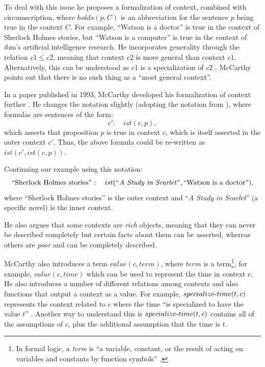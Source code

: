 To deal with this issue he proposes a formalization of context, combined with circumscription, where $holds(p, C)$ is an abbreviation for the sentence $p$ being true in the context $C$. For example, ``Watson is a doctor'' is true in the context of Sherlock Holmes stories, but ``Watson is a computer'' is true in the context of \acrshort{ibm}'s artificial intelligence research. He incorporates generality through the relation $c1 \le c2$, meaning that context $c2$ is more general than context $c1$. Alternatively, this can be understood as $c1$ is a specialization of $c2$ \cite{akman1996steps}. McCarthy points out that there is no such thing as a ``most general context''.

In a paper published in 1993, McCarthy developed his formalization of context further \cite{McCarthy1993}. He changes the notation slightly (adopting the notation from \cite{guha1991contexts}), where formulas are sentences of the form:
\begin{equation}
  \label{eq:ist1}
 c': \quad	ist(c,p),
\end{equation}
which asserts that proposition $p$ is true in context $c$, which is itself asserted in the outer context $c'$. Thus, the above formula could be re-written as $ist(c', ist(c,p))$. 

Continuing our example using this notation:
\begin{equation}
  \label{eq:context1}
 \text{``Sherlock Holmes stories''}: \quad	ist(\text{``\emph{A Study in Scarlet}''},\text{``Watson is a doctor''}),
\end{equation}
where ``Sherlock Holmes stories'' is the outer context and ``\emph{A Study in Scarlet}'' (a specific novel) is the inner context.

He also argues that some contexts are \emph{rich} objects, meaning that they can never be described completely but certain facts about them can be asserted, whereas others are \emph{poor} and can be completely described.

McCarthy also introduces a term $value(c,term)$, where $term$ is a term\footnote{In formal logic, a \emph{term} is ``a variable, constant, or the result of acting on variables and constants by function symbols'' \cite{Weisstein2014}.}, for example, $value(c,time)$ which can be used to represent the time in context $c$. He also introduces a number of different relations among contexts and also functions that output a context as a value. For example, $specialize\textnormal{-}time(t, c)$ represents the context related to $c$ where the time ``is specialized to have the value $t$'' \cite{McCarthy1993}. Another way to understand this is $specialize\textnormal{-}time(t, c)$ contains all of the assumptions of $c$, plus the additional assumption that the time is $t$.

